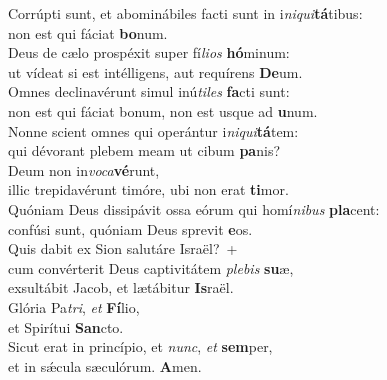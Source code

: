 \evenverse Corrúpti sunt, et abominábiles facti sunt in i\textit{ni}\textit{qui}\textbf{tá}tibus:~\*\\
\evenverse non est qui fáciat \textbf{bo}num.\\
\oddverse Deus de cælo prospéxit super fí\textit{li}\textit{os} \textbf{hó}minum:~\*\\
\oddverse ut vídeat si est intélligens, aut requírens \textbf{De}um.\\
\evenverse Omnes declinavérunt simul inú\textit{ti}\textit{les} \textbf{fa}cti sunt:~\*\\
\evenverse non est qui fáciat bonum, non est usque ad \textbf{u}num.\\
\oddverse Nonne scient omnes qui operántur i\textit{ni}\textit{qui}\textbf{tá}tem:~\*\\
\oddverse qui dévorant plebem meam ut cibum \textbf{pa}nis?\\
\evenverse Deum non in\textit{vo}\textit{ca}\textbf{vé}runt,~\*\\
\evenverse illic trepidavérunt timóre, ubi non erat \textbf{ti}mor.\\
\oddverse Quóniam Deus dissipávit ossa eórum qui homí\textit{ni}\textit{bus} \textbf{pla}cent:~\*\\
\oddverse confúsi sunt, quóniam Deus sprevit \textbf{e}os.\\
\evenverse Quis dabit ex Sion salutáre Israël?~+\\
\evenverse  cum convérterit Deus captivitátem \textit{ple}\textit{bis} \textbf{su}æ,~\*\\
\evenverse exsultábit Jacob, et lætábitur \textbf{Is}raël.\\
\oddverse Glória Pa\textit{tri}, \textit{et} \textbf{Fí}lio,~\*\\
\oddverse et Spirítui \textbf{San}cto.\\
\evenverse Sicut erat in princípio, et \textit{nunc}, \textit{et} \textbf{sem}per,~\*\\
\evenverse et in sǽcula sæculórum. \textbf{A}men.\\
